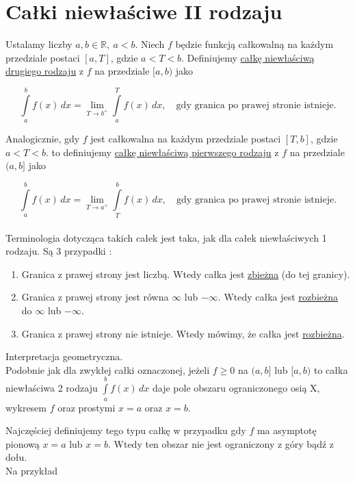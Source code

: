 \section{Całki niewłaściwe II rodzaju}

Ustalamy liczby $ a,b \in \mathbb{R}, \ a < b $. Niech $f$ będzie funkcją całkowalną na każdym przedziale postaci $[a, T] $,
gdzie $ a < T < b $. Definiujemy \underline{całkę niewłaściwą drugiego rodzaju} z $f$ na przedziale $[a, b)$ jako

$$ \int\limits_{a}^{b} f(x) \,dx = \lim_{T \to b^+} \int\limits_{a}^{T} f(x) \,dx, \quad \textrm{gdy granica po prawej stronie istnieje.}$$

Analogicznie, gdy $f$ jest całkowalna na każdym przedziale postaci $[T,b]$, gdzie $ a < T < b $. to definiujemy
\underline{całkę niewłaściwą pierwszego rodzaju} z $f$ na przedziale $(a, b]$ jako

$$ \int\limits_{a}^{b} f(x) \,dx = \lim_{T \to a^+} \int\limits_{T}^{b} f(x) \,dx, \quad \textrm{gdy granica po prawej stronie istnieje.}$$\\

Terminologia dotycząca takich całek jest taka, jak dla całek niewłaściwych 1 rodzaju. Są 3 przypadki : 

\begin{enumerate}
    \item Granica z prawej strony jest liczbą. Wtedy całka jest \underline{zbieżna} (do tej granicy).
    \item Granica z prawej strony jest równa $\infty$ lub $-\infty$. Wtedy całka jest \underline{rozbieżna} do $\infty$ lub $-\infty$.
    \item Granica z prawej strony nie istnieje. Wtedy mówimy, że całka jest \underline{rozbieżna}. \\
\end{enumerate}

Interpretacja geometryczna. \\

Podobnie jak dla zwykłej całki oznaczonej, jeżeli $f \geq 0$ na $(a,b]$ lub $[a,b)$ to całka niewłaściwa 2 rodzaju
$ \int\limits_{a}^{b} f(x) \,dx $ daje pole obszaru ograniczonego osią X, wykresem $f$ oraz prostymi $x=a$ oraz $x=b$.

Najczęściej definiujemy tego typu całkę w przypadku gdy $f$ ma asymptotę pionową $x=a$ lub $x=b$. Wtedy ten obszar
nie jest ograniczony z góry bądź z dołu. \\

Na przykład

